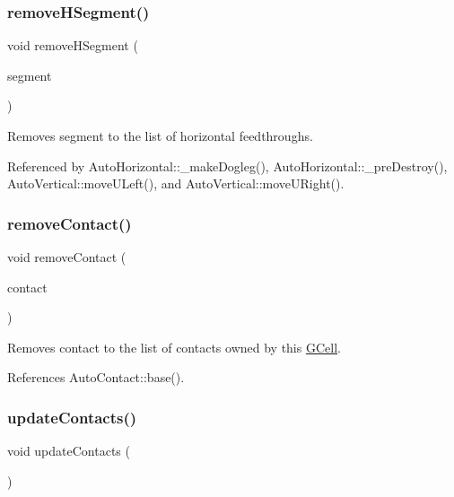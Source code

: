 \subsubsection{\texorpdfstring{remove\+H\+Segment()}{removeHSegment()}}
{\footnotesize\ttfamily void remove\+H\+Segment (\begin{DoxyParamCaption}\item[{\mbox{\hyperlink{classKatabatic_1_1AutoSegment}{Auto\+Segment}} $\ast$}]{segment }\end{DoxyParamCaption})}

Removes {\ttfamily segment} to the list of horizontal feedthroughs. 

Referenced by Auto\+Horizontal\+::\+\_\+make\+Dogleg(), Auto\+Horizontal\+::\+\_\+pre\+Destroy(), Auto\+Vertical\+::move\+U\+Left(), and Auto\+Vertical\+::move\+U\+Right().

\mbox{\label{classKatabatic_1_1GCell_aa052a9427fbd4185f00567a97770f80b}} 
\subsubsection{\texorpdfstring{remove\+Contact()}{removeContact()}}
{\footnotesize\ttfamily void remove\+Contact (\begin{DoxyParamCaption}\item[{\mbox{\hyperlink{classKatabatic_1_1AutoContact}{Auto\+Contact}} $\ast$}]{contact }\end{DoxyParamCaption})}

Removes {\ttfamily contact} to the list of contacts owned by this \mbox{\hyperlink{classKatabatic_1_1GCell}{G\+Cell}}. 

References Auto\+Contact\+::base().

\mbox{\label{classKatabatic_1_1GCell_aa0beea2ceaa543503346967085036d1a}} 
\subsubsection{\texorpdfstring{update\+Contacts()}{updateContacts()}}
{\footnotesize\ttfamily void update\+Contacts (\begin{DoxyParamCaption}{ }\end{DoxyParamCaption})}

